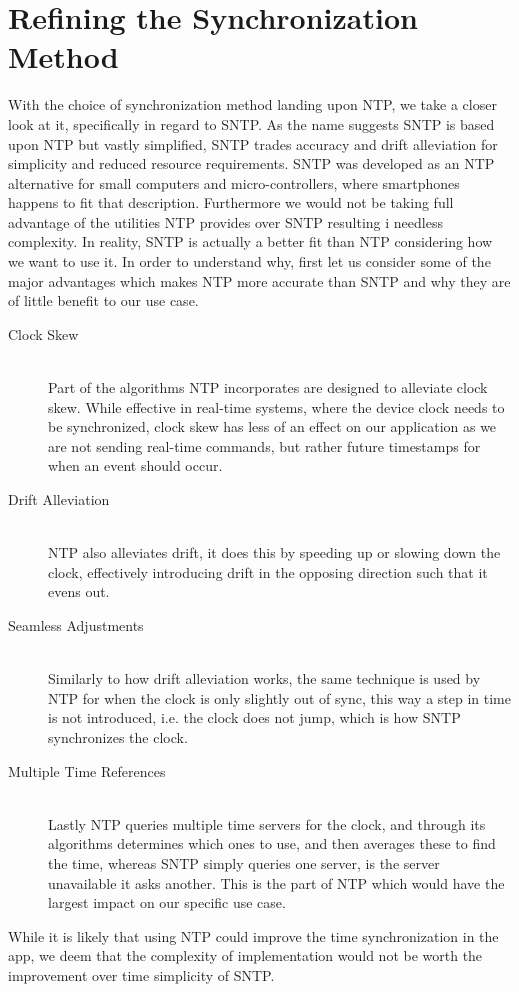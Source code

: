 \section{Refining the Synchronization Method}\label{sec:sntp}
With the choice of synchronization method landing upon \ac{NTP}, we take a closer look at it, specifically in regard to \ac{SNTP}.
As the name suggests \ac{SNTP} is based upon \ac{NTP} but vastly simplified, \ac{SNTP} trades accuracy and drift alleviation for simplicity and reduced resource requirements.
\ac{SNTP} was developed as an \ac{NTP} alternative for small computers and micro-controllers, where smartphones happens to fit that description.
Furthermore we would not be taking full advantage of the utilities \ac{NTP} provides over \ac{SNTP} resulting i needless complexity.
In reality, \ac{SNTP} is actually a better fit than \ac{NTP} considering how we want to use it.
In order to understand why, first let us consider some of the major advantages which makes \ac{NTP} more accurate than \ac{SNTP} and why they are of little benefit to our use case.\cite{sntp_ntp}
\begin{description}
    \item [Clock Skew] \hfill \\
    Part of the algorithms \ac{NTP} incorporates are designed to alleviate clock skew.
    While effective in real-time systems, where the device clock needs to be synchronized,
    clock skew has less of an effect on our application as we are not sending real-time commands, but rather future timestamps for when an event should occur.
    \item [Drift Alleviation] \hfill \\
    \ac{NTP} also alleviates drift, it does this by speeding up or slowing down the clock, effectively introducing drift in the opposing direction such that it evens out.
    \item [Seamless Adjustments] \hfill \\
    Similarly to how drift alleviation works, the same technique is used by \ac{NTP} for when the clock is only slightly out of sync, this way a step in time is not introduced, i.e. the clock does not jump, which is how \ac{SNTP} synchronizes the clock.
    \item [Multiple Time References] \hfill \\
    Lastly \ac{NTP} queries multiple time servers for the clock, and through its algorithms determines which ones to use, and then averages these to find the time, whereas \ac{SNTP} simply queries one server, is the server unavailable it asks another.
    This is the part of \ac{NTP} which would have the largest impact on our specific use case.
\end{description}

While it is likely that using \ac{NTP} could improve the time synchronization in the app, we deem that the complexity of implementation would not be worth the improvement over time simplicity of \ac{SNTP}.
